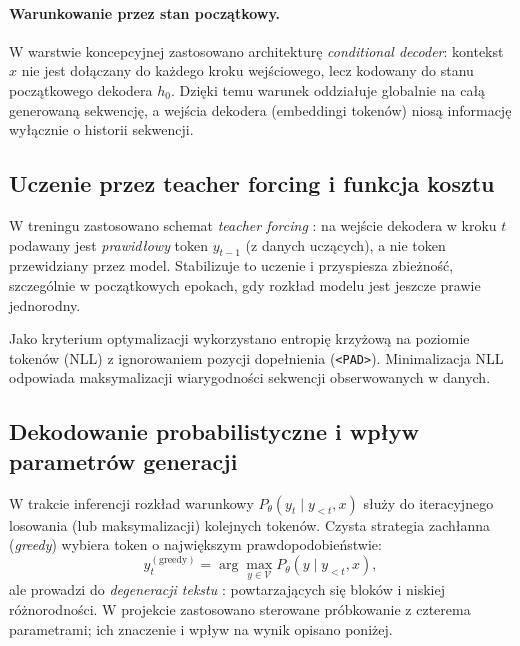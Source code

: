 \documentclass[12pt,a4paper]{article}
\begin{document}
\paragraph{Warunkowanie przez stan początkowy.}
W warstwie koncepcyjnej zastosowano architekturę \emph{conditional decoder}: kontekst $x$ nie jest dołączany do każdego kroku wejściowego, lecz kodowany do stanu początkowego dekodera $h_0$. Dzięki temu warunek oddziałuje globalnie na całą generowaną sekwencję, a wejścia dekodera (embeddingi tokenów) niosą informację wyłącznie o historii sekwencji.

\subsection{Uczenie przez teacher forcing i funkcja kosztu}

W treningu zastosowano schemat \textit{teacher forcing} \citep{williams1989tf}: na wejście dekodera w kroku $t$ podawany jest \emph{prawidłowy} token $y_{t-1}$ (z danych uczących), a nie token przewidziany przez model. Stabilizuje to uczenie i przyspiesza zbieżność, szczególnie w początkowych epokach, gdy rozkład modelu jest jeszcze prawie jednorodny.

Jako kryterium optymalizacji wykorzystano entropię krzyżową na poziomie tokenów (NLL) z ignorowaniem pozycji dopełnienia (\texttt{<PAD>}). Minimalizacja NLL odpowiada maksymalizacji wiarygodności sekwencji obserwowanych w danych.

\subsection{Dekodowanie probabilistyczne i wpływ parametrów generacji}
\label{sec:decoding}

W trakcie inferencji rozkład warunkowy $P_\theta(y_t \mid y_{<t}, x)$ służy do iteracyjnego losowania (lub maksymalizacji) kolejnych tokenów. Czysta strategia zachłanna (\textit{greedy}) wybiera token o największym prawdopodobieństwie:
\begin{equation}
y_t^{(\text{greedy})} = \arg\max_{y \in \mathcal{V}} P_\theta(y \mid y_{<t}, x),
\end{equation}
ale prowadzi do \emph{degeneracji tekstu} \citep{holtzman2020nucleus}: powtarzających się bloków i niskiej różnorodności. W projekcie zastosowano sterowane próbkowanie z czterema parametrami; ich znaczenie i wpływ na wynik opisano poniżej.
\end{document}
